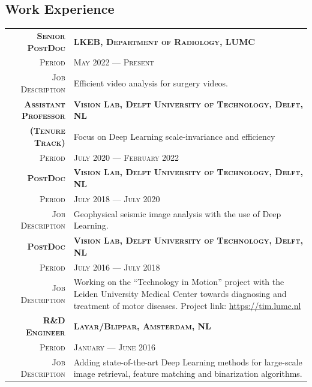 \documentclass[a4paper, oneside, final]{scrartcl}
\newcommand{\gray}{\rowcolor[gray]{.90}}
\begin{document}
\begin{center}
		\section{Work Experience}
		\begin{tabular}{r@{\hskip 0.3in}p{13.3cm}}
			\gray \textsc{\textbf{Senior PostDoc}} & \textsc{\textbf{LKEB, Department of Radiology, LUMC}}\\
			\textsc{Period}                     & \textsc{May 2022 --- Present} \\
			\textsc{Job Description}            & Efficient video analysis for surgery videos. 
            \vspace{5px}\\
			\gray \textsc{\textbf{Assistant Professor}} & \textsc{\textbf{Vision Lab, Delft University of Technology, Delft, NL}}\\
			\gray \textsc{\textbf{(Tenure Track)}} & Focus on Deep Learning scale-invariance and efficiency\\
			\textsc{Period}                     & \textsc{July 2020 --- February 2022} 
            \vspace{5px}\\
			\gray \textsc{\textbf{PostDoc}}     & \textsc{\textbf{Vision Lab, Delft University of Technology, Delft, NL}}\\
			\textsc{Period}                     & \textsc{July 2018 --- July 2020} \\
			\textsc{Job Description}            & Geophysical seismic image analysis with the use of Deep Learning. 
            \vspace{5px}\\
			\gray \textsc{\textbf{PostDoc}}     & \textsc{\textbf{Vision Lab, Delft University of Technology, Delft, NL}}\\
			\textsc{Period}                     & \textsc{July 2016 --- July 2018} \\
			\textsc{Job Description}            & Working on the ``Technology in Motion'' project with the Leiden University Medical Center 
				towards diagnosing and treatment of motor diseases.
				Project link: \href{https://tim.lumc.nl}{https://tim.lumc.nl}
            \vspace{5px}\\
			\gray \textsc{\textbf{R\&D Engineer}}   & \textsc{\textbf{Layar\slash Blippar, Amsterdam, NL}}\\
			\textsc{Period}                         & \textsc{January --- June 2016} \\
			\textsc{Job Description}                &  Adding state-of-the-art Deep Learning methods for large-scale image retrieval, 
				feature matching and binarization algorithms.\\
		\end{tabular}


\end{center}
\end{document}
